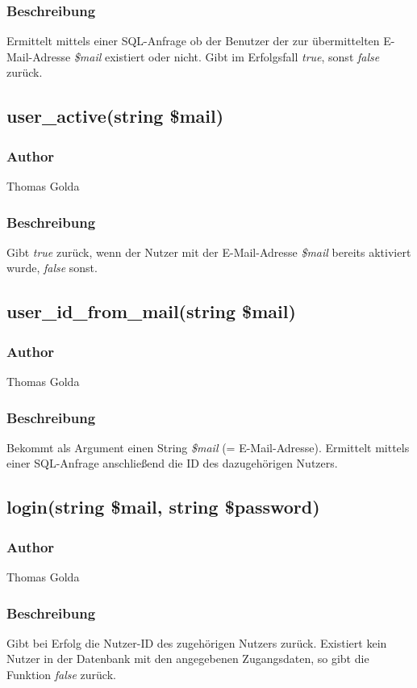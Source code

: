 \documentclass[fontsize = 12pt, paper = a4]{scrreprt}
\begin{document}
\subsubsection*{Beschreibung}
Ermittelt mittels einer SQL-Anfrage ob der Benutzer der zur übermittelten E-Mail-Adresse \textit{\$mail} existiert oder nicht. Gibt im Erfolgsfall \textit{true}, sonst \textit{false} zurück.


\subsection*{user\_active(string \$mail)}
\subsubsection*{Author}
Thomas Golda
\subsubsection*{Beschreibung}
Gibt \textit{true} zurück, wenn der Nutzer mit der E-Mail-Adresse \textit{\$mail} bereits aktiviert wurde, \textit{false} sonst.


\subsection*{user\_id\_from\_mail(string \$mail)}
\subsubsection*{Author}
Thomas Golda
\subsubsection*{Beschreibung}
Bekommt als Argument einen String \textit{\$mail} (= E-Mail-Adresse). Ermittelt mittels einer SQL-Anfrage anschließend die ID des dazugehörigen Nutzers.


\subsection*{login(string \$mail, string \$password)}
\subsubsection*{Author}
Thomas Golda
\subsubsection*{Beschreibung}
Gibt bei Erfolg die Nutzer-ID des zugehörigen Nutzers zurück. Existiert kein Nutzer in der Datenbank mit den angegebenen Zugangsdaten, so gibt die Funktion \textit{false} zurück.
\end{document}
